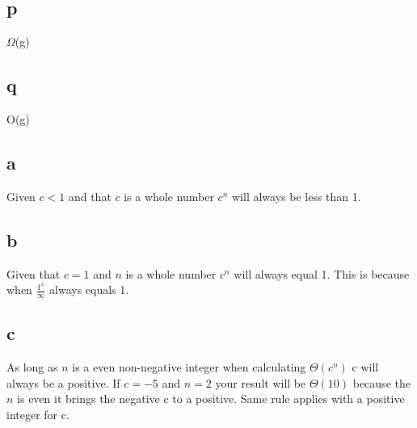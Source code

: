 \documentclass[12pt]{amsart}
\begin{document}
\subsection*{p}
$\Omega$(g)
\subsection*{q}
O(g)

\break

\subsection*{a}
Given $c < 1$ and that $c$ is a whole number $c^n$ will always be less than 1.

\subsection*{b}
Given that $c = 1$ and $n$ is a whole number $c^n$ will always equal 1. This is because when $\frac{1^{x}}{\infty}$ always equals 1.

\subsection*{c}
As long as $n$ is a even non-negative integer when calculating $\Theta(c^n)$ c will always be a positive. If $c = -5$ and $n = 2$ your result will be $\Theta(10)$ because the $n$ is even it brings the negative c to a positive. Same rule applies with a positive integer for c.
\end{document}
